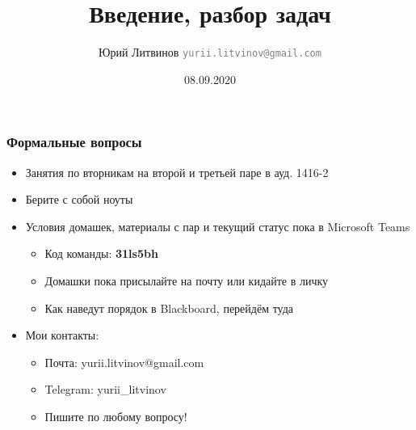 \documentclass[xetex,mathserif,serif]{beamer}
\title{Введение, разбор задач}
\author[Юрий Литвинов]{Юрий Литвинов \newline \textcolor{gray}{\small\texttt{yurii.litvinov@gmail.com}}}
\date{08.09.2020}
\begin{document}
    \frame{\titlepage}

    \begin{frame}
        \frametitle{Формальные вопросы}
        \begin{itemize}
            \item Занятия по вторникам на второй и третьей паре в ауд. 1416-2
            \item Берите с собой ноуты
            \item Условия домашек, материалы с пар и текущий статус пока в Microsoft Teams
            \begin{itemize}
                \item Код команды: \textbf{31ls5bh}
                \item Домашки пока присылайте на почту или кидайте в личку
                \item Как наведут порядок в Blackboard, перейдём туда
            \end{itemize}
            \item Мои контакты:
            \begin{itemize}
                \item Почта: yurii.litvinov@gmail.com
                \item Telegram: yurii\_litvinov
                \item Пишите по любому вопросу!
            \end{itemize}
        \end{itemize}
    \end{frame}
\end{document}
